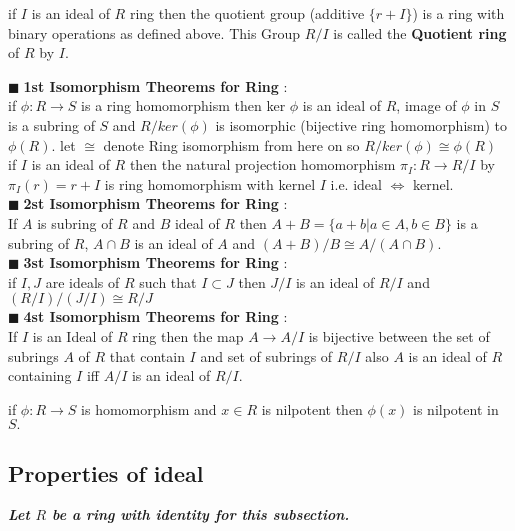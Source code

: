 \documentclass[11pt]{extarticle}
\newcommand{\ra}{\rightarrow}
\newcommand{\tbx}[2][]{
	\begin{tcolorbox}[enhanced,breakable,size=small,colback=black!2!white,title={#1},arc is angular, arc=1.5mm,drop fuzzy shadow]
		#2
	\end{tcolorbox}
}
\newcommand{\y}{$\blacksquare\;$}
\begin{document}
\begin{multicols}{2}
{			} 
\tbx{ if $ I $ is an ideal of $ R $ ring then the quotient group (additive $ \{r+I\} $) is a ring with binary operations as defined above. This Group $ R/I $ is called the \textbf{Quotient ring} of $ R $ by $ I. $
			} 
\tbx[\textbf{Isomorphism Theorems for Ring}]{
			\y \textbf{1st Isomorphism Theorems for Ring} : \\ 
			if $ \phi : R\ra S $ is a ring homomorphism then ker $ \phi $ is an ideal of $ R $, image of $ \phi $ in $ S $ is a subring of $ S $ and $ R/ker(\phi) $ is isomorphic (bijective ring homomorphism) to $ \phi(R) .$ let $ \cong $ denote Ring isomorphism from here on so $ R/ker(\phi)\cong \phi(R) $\\
			if $ I $ is an ideal of $ R $ then the natural projection homomorphism $ \pi_I:R \ra R/I $ by $ \pi_I(r)=r+I $ is ring homomorphism   with kernel $ I $ i.e. ideal $ \iff $ kernel.\\
			\y  \textbf{2st Isomorphism Theorems for Ring} : \\ 
			If $ A $ is subring of $ R $ and $ B $ ideal of  $ R $ then $ A+B=\{a+b|a\in A,b\in B\} $ is a subring of $ R $, $ A\cap B $ is an ideal of $ A $ and $ (A+B)/B\cong A/(A\cap B) .$\\
			\y  \textbf{3st Isomorphism Theorems for Ring} : \\ 
			if $ I,J $ are ideals of $ R $ such that $ I	\subset J $ then $ J/I $ is an ideal of $ R/I $ and $ (R/I)/(J/I)\cong R/J $\\
			\y \textbf{4st Isomorphism Theorems for Ring} :  \\
			If $ I $ is an Ideal of $ R $ ring then the map $ A\ra A/I $ is bijective between the set of subrings $ A $ of $ R $ that contain $ I $ and set of subrings of $ R/I $ also $ A $ is an ideal of $ R $ containing $ I $ iff $ A/I $ is an ideal of $ R/I .$
			} 
\tbx{if $ \phi : R \ra S $ is homomorphism and $ x	\in  R$ is nilpotent then $ \phi(x) $ is nilpotent in $ S. $}
			\subsection{Properties of ideal}
			\textbf{\large \emph{Let $ R $ be a ring with identity for this subsection.}}
			

\end{multicols}
\end{document}
